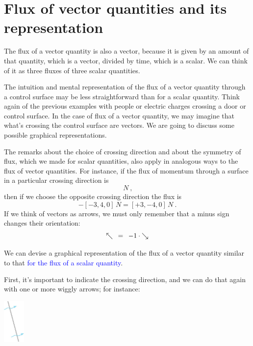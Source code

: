 \documentclass[a4paper,12pt,%
onecolumn,oneside,%
british%
]{memoir}
\renewcommand*{\|}[1][]{\nonscript\:#1\vert\nonscript\:\mathopen{}}
\newcommand*{\sect}{\S}%
\renewcommand*{\autoref}[2]{\sidepar{\vspace{-1ex}\footnotesize{\color{blue}\faIcon{%
angle-right%
}\enskip\sect~\ref{#1} page~\pageref{#1}}}\textcolor{blue}{#2}}
\begin{document}
\section{Flux of vector quantities and its representation}
\label{sec:intuition_fluxes_vector}

The flux of a vector quantity is also a vector, because it is given by an amount of that quantity, which is a vector, divided by time, which is a scalar. We can think of it as three fluxes of three scalar quantities.

The intuition and mental representation of the flux of a vector quantity through a control surface may be less straightforward than for a scalar quantity. Think again of the previous examples with people or electric charges crossing a door or control surface. In the case of flux of a vector quantity, we may imagine that what's crossing the control surface are vectors. We are going to discuss some possible graphical representations.

The remarks about the choice of crossing direction and about the symmetry of flux, which we made for scalar quantities, also apply in analogous ways to the flux of vector quantities. For instance, if the flux of momentum through a surface in a particular crossing direction is
\begin{equation*}
  [-3, 4, 0]\,\unit{N} \ ,
\end{equation*}
then if we choose the opposite crossing direction the flux is
\begin{equation*}
  -[-3, 4, 0]\,\unit{N} = [+3, -4, 0]\,\unit{N}\ .
\end{equation*}
If we think of vectors as arrows, we must only remember that a minus sign changes their orientation:\noprelistbreak
\begin{equation*}
  \mathord{\nwarrow} \mathrel{\enskip=\enskip} -1\cdot\mathord{\searrow}
\end{equation*}

\medskip

We can devise a graphical representation of the flux of a vector quantity similar to that \autoref{sec:flux_scalar_representation}{for the flux of a scalar quantity}.

First, it's important to indicate the crossing direction, and we can do that again with one or more wiggly arrows; for instance:\noprelistbreak
\begin{center}
  \medskip
  \includegraphics[height=6em]{images/surface_tilted_crossing.jpg}
\end{center}
\end{document}
